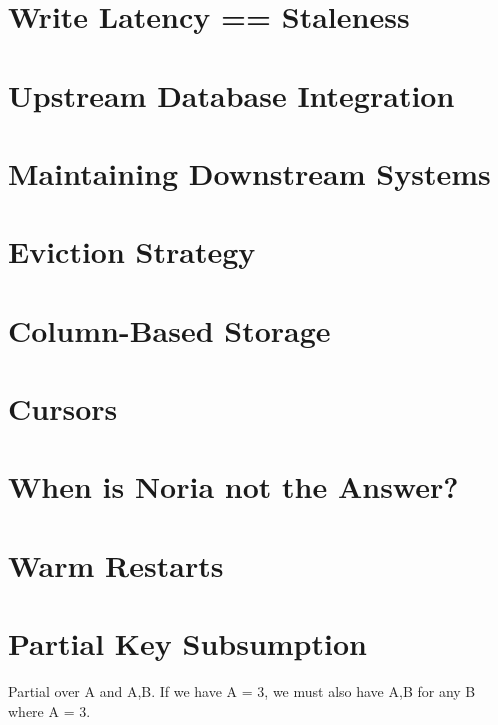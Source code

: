 \section{Write Latency == Staleness}

\section{Upstream Database Integration}

\section{Maintaining Downstream Systems}

\section{Eviction Strategy}

\section{Column-Based Storage}

\section{Cursors}

\section{When is Noria not the Answer?}

\section{Warm Restarts}

\section{Partial Key Subsumption}

Partial over A and A,B. If we have A = 3, we must also have A,B for any B where
A = 3.
